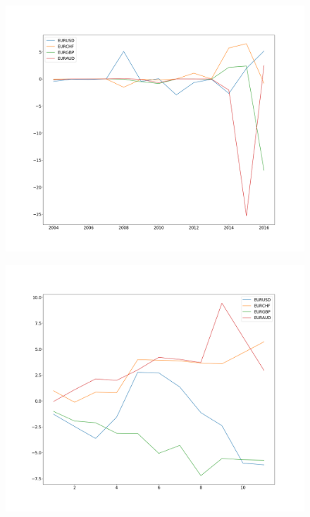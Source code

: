 \documentclass[a4paper]{article}
\begin{document}
\begin{figure}[h]
	\centering
	\begin{minipage}{.5\textwidth}
		\centering
		\includegraphics[width=\linewidth]{Figures/strat_1_performance_in}
		\label{fig:9}
	\end{minipage}%
	\begin{minipage}{.5\textwidth}
		\centering
		\includegraphics[width=\linewidth]{Figures/strat_1_performance_out}
		\label{fig:10}
	\end{minipage}
\end{figure}
\end{document}
